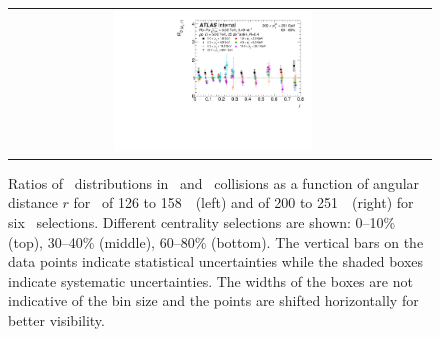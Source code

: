 \begin{figure}[h]
{\begin{tabular}{cc}
            \includegraphics[width=0.5\textwidth]{figures/results/RDpT_dR_jet9_cent5.pdf} \\
      \end{tabular}
      }
\caption{Ratios of \Dptr\ distributions in \PbPb\ and \pp\ collisions as a function of angular distance $r$ for \ptjet\ of 126 to 158~\GeV\ (left) and of 200 to 251~\GeV\ (right) for six \pt\ selections. Different centrality selections are shown: 0--10\% (top), 30--40\% (middle), 60--80\% (bottom). The vertical bars on the data points indicate statistical uncertainties while the shaded boxes indicate systematic uncertainties. The widths of the boxes are not indicative of the bin size and the points are shifted horizontally for better visibility.}
\label{fig:rdptr}
\end{figure}




